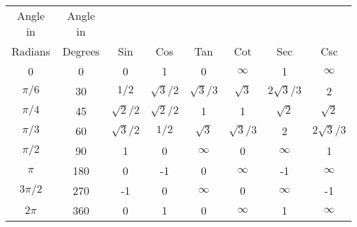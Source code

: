 \begin{center}
\begin{tabular}{cccccccc}
Angle in    &  Angle in &                &                &                &                &                  &                  \\
Radians     &   Degrees &  Sin           &  Cos           & Tan            & Cot            &   Sec            & Csc              \\  \hline
0           & 0         &  0             & 1              & 0              & $\infty$       & 1                & $\infty$         \\
$\pi / 6$   & 30        & $1 / 2$        & $\sqrt{3} / 2$ & $\sqrt{3} / 3$ & $\sqrt{3}$     & $2 \sqrt{3} / 3$ & 2                \\
$\pi / 4$   & 45        & $\sqrt{2} / 2$ & $\sqrt{2} / 2$ & 1              & 1              & $\sqrt{2}$       & $\sqrt{2}$       \\
$\pi / 3$   & 60        & $\sqrt{3} / 2$ & $1 / 2$        & $\sqrt{3}$     & $\sqrt{3} / 3$ & 2                & $2 \sqrt{3} / 3$ \\
$\pi / 2$   & 90        & 1              & 0              & $\infty$       & 0              & $\infty$         & 1                \\
$\pi$       & 180       & 0              & -1             & 0              & $\infty$       & -1               & $\infty$         \\
$3 \pi / 2$ & 270       & -1             & 0              & $\infty$       & 0              & $\infty$         & -1               \\
$2 \pi$     & 360       & 0              & 1              & 0              & $\infty$       & 1                & $\infty$         \\
\end{tabular}
\end{center}

